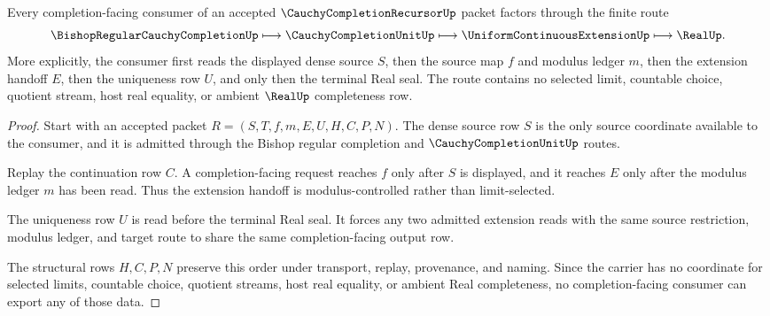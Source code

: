 \begin{theorem}
\label{thm:cauchy-completion-recursor-universal-route}
Every completion-facing consumer of an accepted $\CauchyCompletionRecursorUp$ packet factors through the finite route
$$
\BishopRegularCauchyCompletionUp \longmapsto \CauchyCompletionUnitUp \longmapsto \UniformContinuousExtensionUp \longmapsto \RealUp .
$$
More explicitly, the consumer first reads the displayed dense source $S$, then the source map $f$ and modulus ledger $m$, then the extension handoff $E$, then the uniqueness row $U$, and only then the terminal Real seal. The route contains no selected limit, countable choice, quotient stream, host real equality, or ambient $\RealUp$ completeness row.
\end{theorem}
\begin{proof}
Start with an accepted packet $R=(S,T,f,m,E,U,H,C,P,N)$. The dense source row $S$ is the only source coordinate available to the consumer, and it is admitted through the Bishop regular completion and $\CauchyCompletionUnitUp$ routes.

Replay the continuation row $C$. A completion-facing request reaches $f$ only after $S$ is displayed, and it reaches $E$ only after the modulus ledger $m$ has been read. Thus the extension handoff is modulus-controlled rather than limit-selected.

The uniqueness row $U$ is read before the terminal Real seal. It forces any two admitted extension reads with the same source restriction, modulus ledger, and target route to share the same completion-facing output row.

The structural rows $H,C,P,N$ preserve this order under transport, replay, provenance, and naming. Since the carrier has no coordinate for selected limits, countable choice, quotient streams, host real equality, or ambient Real completeness, no completion-facing consumer can export any of those data.
\end{proof}


